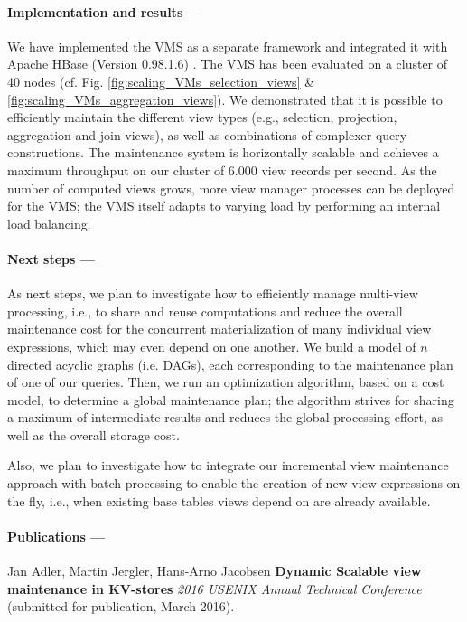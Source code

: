      
    
   \paragraph{Implementation and results ---} 
 	We have implemented the VMS as a separate framework and integrated it 
	with Apache HBase (Version 0.98.1.6) \cite{Adler_2016_a}. The VMS has been 
	evaluated on a cluster of 40 nodes (cf. Fig. 
	\ref{fig:scaling_VMs_selection_views} \& 
	\ref{fig:scaling_VMs_aggregation_views}). We demonstrated that it is 
	possible to efficiently maintain the different view types (e.g., 
	selection, projection, aggregation and join views), as well as 
	combinations of complexer query constructions. The maintenance system is 
	horizontally scalable and achieves a maximum throughput on our cluster 
	of 6.000 view records per second. As the number of computed views grows, 
	more view manager processes can be deployed for the VMS; the VMS itself 
	adapts to varying load by performing an internal load balancing. 




     
   \paragraph{Next steps ---}
	 As next steps, we plan to investigate how to efficiently manage 
	multi-view processing, i.e., to share and reuse computations and reduce 
	the overall maintenance cost for the concurrent materialization of many 
	individual view expressions, which may even depend on one another. We
	build a model of $n$ directed acyclic graphs (i.e. DAGs), each 
	corresponding to the maintenance plan of one of our queries. Then, we 
	run an optimization algorithm, based on a cost model, to determine a
	global maintenance plan; the algorithm strives for sharing a maximum
	of intermediate results and reduces the global processing effort, as
	well as the overall storage cost.
	
	
	Also, we plan to investigate how to integrate our incremental view 
	maintenance approach with batch processing to enable the creation of new 
	view expressions on the fly, i.e., when existing base tables views depend 
	on are already available. 

  \paragraph{Publications ---}
	
   Jan Adler, Martin Jergler, Hans-Arno Jacobsen
   \textbf{Dynamic Scalable view maintenance in KV-stores}
   \textit{2016 USENIX Annual Technical Conference} (submitted for publication, March 2016).

  